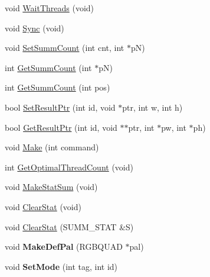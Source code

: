 \begin{DoxyCompactItemize}
\item 
void \hyperlink{class_c_v_i_engine_base_a305c1b2285ddfcdbb021597f0b3dbd39}{Wait\+Threads} (void)
\item 
void \hyperlink{class_c_v_i_engine_base_af12866653055639e69a61224615af7fe}{Sync} (void)
\item 
void \hyperlink{class_c_v_i_engine_base_a4b6c77fcb50dcb01f299d7e0f4b05ea6}{Set\+Summ\+Count} (int cnt, int $\ast$p\+N)
\item 
int \hyperlink{class_c_v_i_engine_base_adb6193dca9e4f6c71ad6e77df88bc9f7}{Get\+Summ\+Count} (int $\ast$p\+N)
\item 
int \hyperlink{class_c_v_i_engine_base_a354f23eda839e4aff3b578fc5ad50363}{Get\+Summ\+Count} (int pos)
\item 
bool \hyperlink{class_c_v_i_engine_base_a38d38d266d48fad44435eec46a1086a6}{Set\+Result\+Ptr} (int id, void $\ast$ptr, int w, int h)
\item 
bool \hyperlink{class_c_v_i_engine_base_a99f7df701bfe9d53121e5cd00167e591}{Get\+Result\+Ptr} (int id, void $\ast$$\ast$ptr, int $\ast$pw, int $\ast$ph)
\item 
void \hyperlink{class_c_v_i_engine_base_aa59b55fc315394f4c19cb7d95c399913}{Make} (int command)
\item 
int \hyperlink{class_c_v_i_engine_base_a1e0174d46d3d28931a648e0437f0686d}{Get\+Optimal\+Thread\+Count} (void)
\item 
void \hyperlink{class_c_v_i_engine_base_a2b86bf7f377f62e7a701fb3466708d04}{Make\+Stat\+Sum} (void)
\item 
void \hyperlink{class_c_v_i_engine_base_a10d6138a2c8f4c4c946bf930c268be6b}{Clear\+Stat} (void)
\item 
void \hyperlink{class_c_v_i_engine_base_adb910c0d7f06cf1f3ea7b2347aed1751}{Clear\+Stat} (S\+U\+M\+M\+\_\+\+S\+T\+A\+T \&S)
\item 
\hypertarget{class_c_v_i_engine_base_a96dd47cc32f324e133644e7f823507ad}{void {\bfseries Make\+Def\+Pal} (R\+G\+B\+Q\+U\+A\+D $\ast$pal)}\label{class_c_v_i_engine_base_a96dd47cc32f324e133644e7f823507ad}

\item 
\hypertarget{class_c_v_i_engine_base_a22ba2d068df7651b957bb7cb00a324be}{void {\bfseries Set\+Mode} (int tag, int id)}\label{class_c_v_i_engine_base_a22ba2d068df7651b957bb7cb00a324be}


\end{DoxyCompactItemize}
